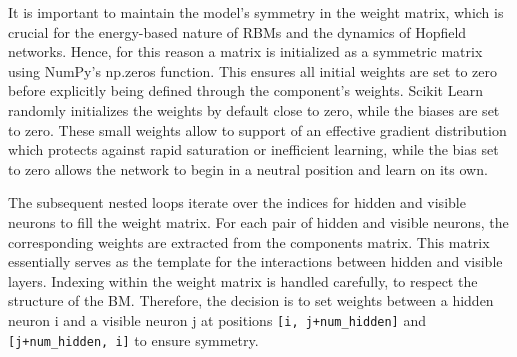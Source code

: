 It is important to maintain the model's symmetry in the weight matrix, which is crucial for the energy-based nature of \ac{RBM}s and the dynamics of Hopfield networks.
Hence, for this reason a matrix is initialized as a symmetric matrix using NumPy's np.zeros function.
This ensures all initial weights are set to zero before explicitly being defined through the component's weights.
Scikit Learn randomly initializes the weights by default close to zero, while the biases are set to zero. 
These small weights allow to support of an effective gradient distribution which protects against rapid saturation or inefficient learning,
while the bias set to zero allows the network to begin in a neutral position and learn on its own. 

The subsequent nested loops iterate over the indices for hidden and visible neurons to fill the weight matrix.
For each pair of hidden and visible neurons, the corresponding weights are extracted from the components matrix.
This matrix essentially serves as the template for the interactions between hidden and visible layers.
Indexing within the weight matrix is handled carefully, to respect the structure of the \ac{BM}. 
Therefore, the decision is to set weights between a hidden neuron i and a visible neuron j at positions \texttt{[i, j+num\_hidden]} and \texttt{[j+num\_hidden, i]} to ensure symmetry.


